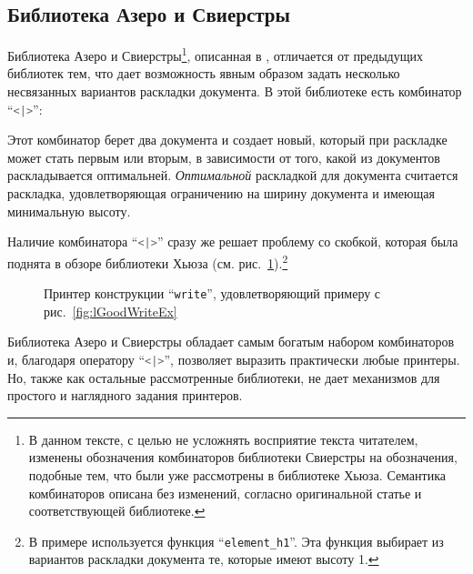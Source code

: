 \newpage

\subsection{Библиотека Азеро и Свиерстры}

Библиотека Азеро и Свиерстры\footnote{
В данном тексте, с целью не усложнять восприятие текста читателем, изменены обозначения комбинаторов библиотеки Свиерстры на обозначения, подобные тем, что были уже рассмотрены в библиотеке Хьюза. Семантика комбинаторов описана без изменений, согласно оригинальной статье и соответствующей библиотеке.
}, описанная в \cite{swierstra}, отличается от предыдущих библиотек тем, что дает возможность явным образом задать несколько несвязанных вариантов раскладки документа. В этой библиотеке есть комбинатор “\lstinline[language=Haskell]{<|>}”:



Этот комбинатор берет два документа и создает новый, который при раскладке может стать первым или вторым, в зависимости от того, какой из документов раскладывается оптимальней. \textit{Оптимальной} раскладкой для документа считается раскладка, удовлетворяющая ограничению на ширину документа и имеющая минимальную высоту.

Наличие комбинатора “\lstinline[language=Haskell]{<|>}” сразу же решает проблему со скобкой, которая была поднята в обзоре библиотеки Хьюза (см. рис.~\ref{fig:bracketSwierstra}).\footnote{
	В примере используется функция “\lstinline[language=Haskell]{element_h1}”. Эта функция выбирает из вариантов раскладки документа те, которые имеют высоту 1.
}

\begin{figure}[h!]
	
	\caption{Принтер конструкции “\lstinline{write}”, удовлетворяющий примеру с рис.~\ref{fig:lGoodWriteEx}}
	\label{fig:bracketSwierstra}
\end{figure}


Библиотека Азеро и Свиерстры обладает самым богатым набором комбинаторов и, благодаря оператору “\lstinline[language=Haskell]{<|>}”, позволяет выразить практически любые принтеры. Но, также как остальные рассмотренные библиотеки, не дает механизмов для простого и наглядного задания принтеров.